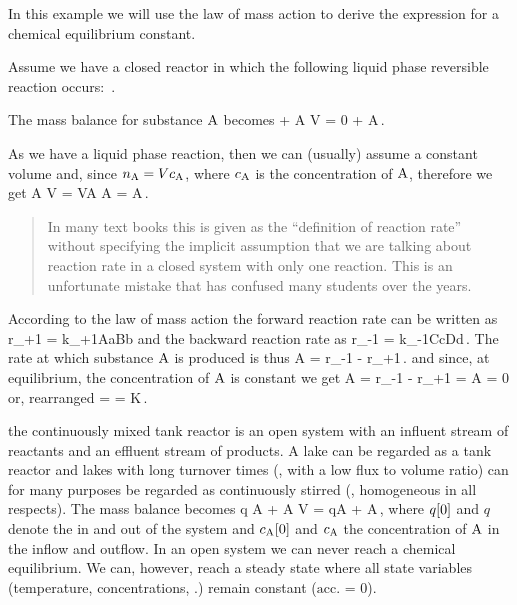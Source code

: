 In this example we will use the law of mass action to derive the expression for a chemical equilibrium constant.

Assume we have a closed reactor in which the following liquid phase reversible reaction occurs:
\beq
{}\,.
\eeq

The mass balance for substance $\subs A$ becomes
\beq
{} + \rrate A V = 0 + \dtamount A\,.
\eeq

As we have a liquid phase reaction, then we can (usually) assume a constant volume and, since $\amount A = V\conc A$, where $\conc A$ is the concentration of $\subs A$, therefore we get
\beq
\rrate A V = V\dtconc A \implies 
\rrate A = \dtconc A\,.
\eeq

\begin{quote}
In many text books this is given as the ``definition of reaction rate'' without specifying the implicit assumption that we are talking about reaction rate in a closed system with only one reaction. This is an unfortunate mistake that has confused many students over the years.
\end{quote}

According to the law of mass action the forward reaction rate can be written as
\beq
r_{+1} = k_{+1}\bconc Aa\bconc Bb
\eeq
and the backward reaction rate as
\beq
r_{-1} = k_{-1}\bconc Cc\bconc Dd\,.
\eeq
The rate at which substance $\subs A$ is produced is thus
\beq
\rrate A = r_{-1} - r_{+1}\,.
\eeq
and since, at equilibrium, the concentration of $\subs A$ is constant we get
\beq
\rrate A = r_{-1} - r_{+1} = \dtconc A = 0
\eeq
or, rearranged
\beq
{} =  = K\,.
\eeq


 the continuously mixed tank reactor is an open system with an influent stream of reactants and an effluent stream of products. A lake can be regarded as a tank reactor and lakes with long turnover times (\eg, with a low flux to volume ratio) can for many purposes be regarded as continuously stirred (\eg, homogeneous in all respects). The mass balance becomes
\beq
{}\implies
q \conc A + \rrate A V = q\conc A + \dtamount A\,,
\eeq
where $q\!\left[{0}\right]$ and $q$ denote the  in and out of the system and $\conc A\vat 0$ and $\conc A$ the concentration of $\subs A$ in the inflow and outflow. In an open system we can never reach a chemical equilibrium. We can, however, reach a steady state where all state variables (temperature, concentrations, \etc.) remain constant ($\text{acc. = 0}$).

